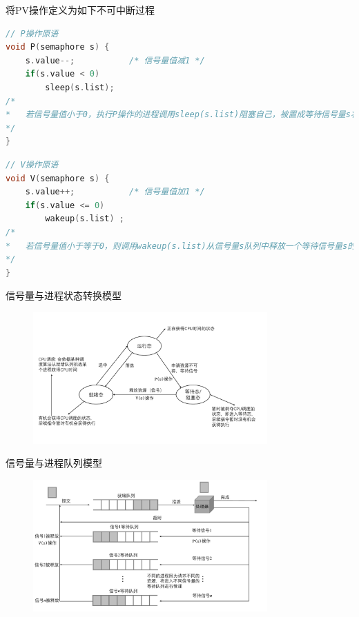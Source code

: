 \documentclass[cs4size,a4paper,10pt]{ctexart}
\begin{document}
	将PV操作定义为如下不可中断过程
	\begin{lstlisting}[language=C,keywordstyle=\color{black}]
// P操作原语
void P(semaphore s) {
	s.value--;           /* 信号量值减1 */
	if(s.value < 0)
		sleep(s.list);
/* 
*   若信号量值小于0，执行P操作的进程调用sleep(s.list)阻塞自己，被置成等待信号量s状态并移入s信号量队列，转向进程调度程序 
*/
}
	\end{lstlisting}

	\begin{lstlisting}[language=C,keywordstyle=\color{black}]
// V操作原语
void V(semaphore s) {
	s.value++;           /* 信号量值加1 */
	if(s.value <= 0)
		wakeup(s.list) ;
/* 
*   若信号量值小于等于0，则调用wakeup(s.list)从信号量s队列中释放一个等待信号量s的进程并转换成就绪态，进程则继续执行 
*/  
}		
	\end{lstlisting}

	信号量与进程状态转换模型
	\begin{figure}[H]
		\centering
		\includegraphics[width=0.8\textwidth]{img/信号量与进程状态转换模型.pdf}
	\end{figure}

	信号量与进程队列模型
	\begin{figure}[H]
		\centering
		\includegraphics[width=0.8\textwidth]{img/信号量与进程队列模型.pdf}
	\end{figure}
\end{document}
